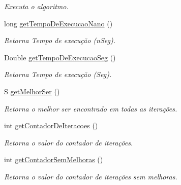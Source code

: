 \begin{DoxyCompactItemize}
\begin{DoxyCompactList}\small\item\em Executa o algoritmo. \end{DoxyCompactList}\item 
long \hyperlink{classic_1_1populacional_1_1algoritmo_1_1_algoritmo_evolucionario_3_01_g_01extends_01_number_00_0bd52af860edf752f8985460efb0aa102_abd2a781b9de3738c4b53cc8d34c17bd1}{get\-Tempo\-De\-Execucao\-Nano} ()
\begin{DoxyCompactList}\small\item\em Retorna Tempo de execução (n\-Seg). \end{DoxyCompactList}\item 
Double \hyperlink{classic_1_1populacional_1_1algoritmo_1_1_algoritmo_evolucionario_3_01_g_01extends_01_number_00_0bd52af860edf752f8985460efb0aa102_a723aedcb3180fa204ecd8b9cdee377f0}{get\-Tempo\-De\-Execucao\-Seg} ()
\begin{DoxyCompactList}\small\item\em Retorna Tempo de execução (Seg). \end{DoxyCompactList}\item 
S \hyperlink{classic_1_1populacional_1_1algoritmo_1_1_algoritmo_evolucionario_3_01_g_01extends_01_number_00_0bd52af860edf752f8985460efb0aa102_af104f8fe66a1b26fb5cb46f069a2a470}{get\-Melhor\-Ser} ()
\begin{DoxyCompactList}\small\item\em Retorna o melhor ser encontrado em todas as iterações. \end{DoxyCompactList}\item 
int \hyperlink{classic_1_1populacional_1_1algoritmo_1_1_algoritmo_evolucionario_3_01_g_01extends_01_number_00_0bd52af860edf752f8985460efb0aa102_a705dfd31a2cb764e754dd5282e602117}{get\-Contador\-De\-Iteracoes} ()
\begin{DoxyCompactList}\small\item\em Retorna o valor do contador de iterações. \end{DoxyCompactList}\item 
int \hyperlink{classic_1_1populacional_1_1algoritmo_1_1_algoritmo_evolucionario_3_01_g_01extends_01_number_00_0bd52af860edf752f8985460efb0aa102_af660cbf1a375f60528058535f247b204}{get\-Contador\-Sem\-Melhoras} ()
\begin{DoxyCompactList}\small\item\em Retorna o valor do contador de iterações sem melhoras. \end{DoxyCompactList}\item 

\end{DoxyCompactItemize}
